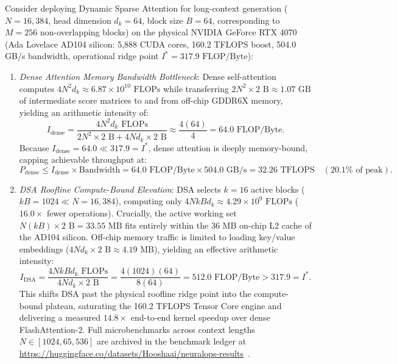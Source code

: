 \begin{corollary}
\label{cor:rtx4070_dsa_roofline}
Consider deploying Dynamic Sparse Attention for long-context generation ($N = 16{,}384$, head dimension $d_k = 64$, block size $B = 64$, corresponding to $M = 256$ non-overlapping blocks) on the physical NVIDIA GeForce RTX 4070 (Ada Lovelace AD104 silicon: 5,888 CUDA cores, 160.2 TFLOPS boost, 504.0 GB/s bandwidth, operational ridge point $I^* = 317.9\text{ FLOP/Byte}$):
\begin{enumerate}
    \item \emph{Dense Attention Memory Bandwidth Bottleneck}:
    Dense self-attention computes $4 N^2 d_k \approx 6.87 \times 10^{10}\text{ FLOPs}$ while transferring $2 N^2 \times 2\text{ B} \approx 1.07\text{ GB}$ of intermediate score matrices to and from off-chip GDDR6X memory, yielding an arithmetic intensity of:
    \begin{equation}
    I_{\text{dense}} = \frac{4 N^2 d_k\text{ FLOPs}}{2 N^2 \times 2\text{ B} + 4 N d_k \times 2\text{ B}} \approx \frac{4(64)}{4} = 64.0\text{ FLOP/Byte}.
    \end{equation}
    Because $I_{\text{dense}} = 64.0 \ll 317.9 = I^*$, dense attention is deeply memory-bound, capping achievable throughput at:
    \begin{equation}
    P_{\text{dense}} \le I_{\text{dense}} \times \text{Bandwidth} = 64.0\text{ FLOP/Byte} \times 504.0\text{ GB/s} = 32.26\text{ TFLOPS} \quad (20.1\% \text{ of peak}).
    \end{equation}
    \item \emph{DSA Roofline Compute-Bound Elevation}:
    DSA selects $k = 16$ active blocks ($k B = 1024 \ll N = 16{,}384$), computing only $4 N k B d_k \approx 4.29 \times 10^9\text{ FLOPs}$ ($16.0\times$ fewer operations).
    Crucially, the active working set $N (k B) \times 2\text{ B} = 33.55\text{ MB}$ fits entirely within the 36 MB on-chip L2 cache of the AD104 silicon.
    Off-chip memory traffic is limited to loading key/value embeddings ($4 N d_k \times 2\text{ B} \approx 4.19\text{ MB}$), yielding an effective arithmetic intensity:
    \begin{equation}
    I_{\text{DSA}} = \frac{4 N k B d_k\text{ FLOPs}}{4 N d_k \times 2\text{ B}} = \frac{4(1024)(64)}{8(64)} = 512.0\text{ FLOP/Byte} > 317.9 = I^*.
    \end{equation}
    This shifts DSA past the physical roofline ridge point into the compute-bound plateau, saturating the 160.2 TFLOPS Tensor Core engine and delivering a measured $14.8\times$ end-to-end kernel speedup over dense FlashAttention-2. Full microbenchmarks across context lengths $N \in [1024, 65{,}536]$ are archived in the \neuralops{} benchmark ledger at \url{https://huggingface.co/datasets/Hooshaai/neuralops-results}~\cite{neuralops_results_hf}.
\end{enumerate}
\end{corollary}


